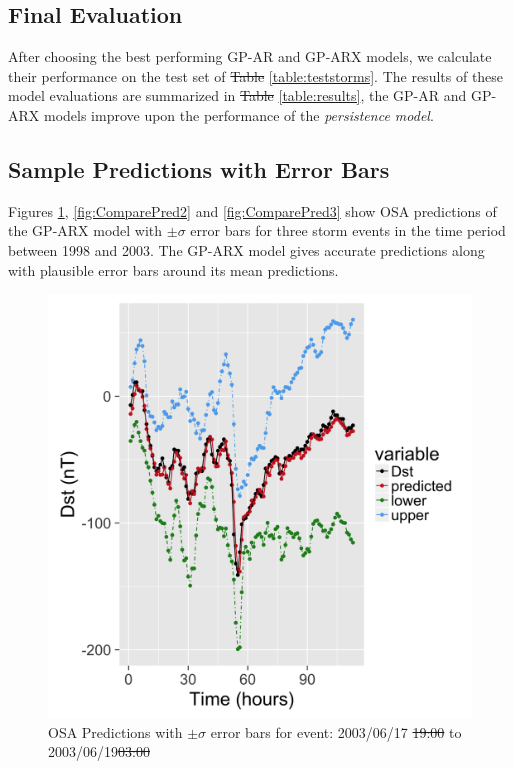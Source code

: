 \documentclass{article}
\providecommand{\DIFadd}[1]{{\protect\color{blue}\uwave{#1}}} %
\providecommand{\DIFdel}[1]{{\protect\color{red}\sout{#1}}}                      %
\providecommand{\DIFaddbegin}{} %
\providecommand{\DIFaddend}{} %
\providecommand{\DIFdelbegin}{} %
\providecommand{\DIFdelend}{} %
\providecommand{\DIFdelFL}[1]{\DIFdel{#1}} %
\providecommand{\DIFdelbeginFL}{} %
\providecommand{\DIFdelendFL}{} %
\newcommand{\DIFscaledelfig}{0.5}
\newlength{\DIFdelgraphicswidth} %
\newlength{\DIFdelgraphicsheight} %
\newcommand{\DIFaddincludegraphics}[2][]{{\color{blue}\fbox{\DIFOincludegraphics[#1]{#2}}}} %
\newcommand{\DIFdelincludegraphics}[2][]{%
\sbox{\DIFdelgraphicsbox}{\DIFOincludegraphics[#1]{#2}}%
\settoboxwidth{\DIFdelgraphicswidth}{\DIFdelgraphicsbox} %
\settoboxtotalheight{\DIFdelgraphicsheight}{\DIFdelgraphicsbox} %
\scalebox{\DIFscaledelfig}{%
\parbox[b]{\DIFdelgraphicswidth}{\usebox{\DIFdelgraphicsbox}\\[-\baselineskip] \rule{\DIFdelgraphicswidth}{0em}}\llap{\resizebox{\DIFdelgraphicswidth}{\DIFdelgraphicsheight}{%
\setlength{\unitlength}{\DIFdelgraphicswidth}%
\begin{picture}(1,1)%
\thicklines\linethickness{2pt} %
{\color[rgb]{1,0,0}\put(0,0){\framebox(1,1){}}}%
{\color[rgb]{1,0,0}\put(0,0){\line( 1,1){1}}}%
{\color[rgb]{1,0,0}\put(0,1){\line(1,-1){1}}}%
\end{picture}%
}\hspace*{3pt}}} %
} %
\DeclareRobustCommand{\DIFaddbegin}{\DIFOaddbegin \let\includegraphics\DIFaddincludegraphics} %
\DeclareRobustCommand{\DIFaddend}{\DIFOaddend \let\includegraphics\DIFOincludegraphics} %
\DeclareRobustCommand{\DIFdelbegin}{\DIFOdelbegin \let\includegraphics\DIFdelincludegraphics} %
\DeclareRobustCommand{\DIFdelend}{\DIFOaddend \let\includegraphics\DIFOincludegraphics} %
\DeclareRobustCommand{\DIFdelbeginFL}{\DIFOdelbeginFL \let\includegraphics\DIFdelincludegraphics} %
\DeclareRobustCommand{\DIFdelendFL}{\DIFOaddendFL \let\includegraphics\DIFOincludegraphics} %
\begin{document}
\subsection*{Final Evaluation}

After choosing the best performing GP-AR and GP-ARX models, we
calculate their performance on the test set of \DIFdelbegin \DIFdel{Table }\DIFdelend \DIFaddbegin \DIFadd{table
}\DIFaddend \ref{table:teststorms}. The results of these model evaluations are
summarized in \DIFdelbegin \DIFdel{Table }\DIFdelend \DIFaddbegin \DIFadd{table }\DIFaddend \ref{table:results}, the GP-AR and GP-ARX models
improve upon the performance of the \emph{persistence model}.

\subsection*{Sample Predictions with Error Bars}

Figures \ref{fig:ComparePred1}, \ref{fig:ComparePred2} and
\ref{fig:ComparePred3} show OSA predictions of the GP-ARX model with
$\pm \sigma$ error bars for three storm events in the time period
between 1998 and 2003. The GP-ARX model gives accurate predictions
along with plausible error bars around its mean predictions.


\begin{figure}[h]
  \includegraphics[width=\textwidth]{PredictionsModel1/PredErrBars_Storm43.png}
  \caption{OSA Predictions with $\pm \sigma$ error bars for event: 2003/06/17 \DIFdelbeginFL \DIFdelFL{19:00 }\DIFdelendFL to 2003/06/19\DIFdelbeginFL \DIFdelFL{03:00}\DIFdelendFL }
  \label{fig:ComparePred1}
\end{figure}
\end{document}
